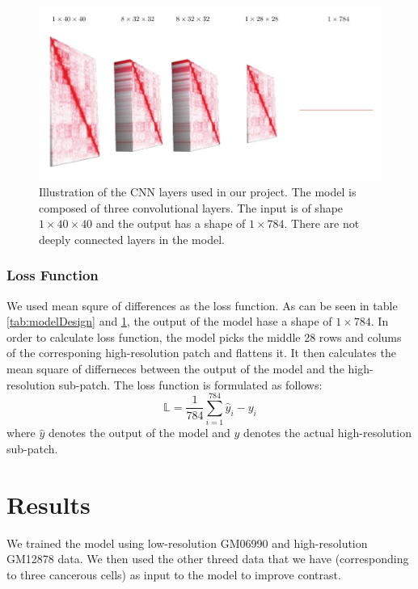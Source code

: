 \documentclass{article}
\begin{document}
\begin{figure}[H]
    \centering
    \includegraphics[width=\textwidth]{model.jpg}
    \caption{Illustration of the CNN layers used in
    our project. The model is composed of three
    convolutional layers. The input is of shape
    $1\times40\times40$ and the output has a
    shape of $1\times784$. There are not deeply
    connected layers in the model.}
    \label{fig:modelDesign}
\end{figure}
\subsubsection{Loss Function}
We used mean squre of
differences as the loss function. As can be
seen in table \ref{tab:modelDesign} and 
\ref{fig:modelDesign}, the output of
the model hase a shape of $1 \times 784$.
In order to calculate loss function,
the model picks the middle 28 rows and colums of the
corresponing high-resolution patch and flattens
it. It then calculates the mean square of differneces
between the output of the model and the high-resolution
sub-patch. The loss function is formulated as follows:
\begin{equation}
    \mathbb{L} = 
    \frac{1}{784}\sum_{i=1}^{784}{\hat{y}_i - y_i}
\end{equation}
where $\hat{y}$ denotes the output of the model and
$y$ denotes the actual high-resolution sub-patch.
\section{Results}
We trained the model using low-resolution 
 GM06990 and high-resolution
 GM12878 data. We then used the other threed
 data that we have (corresponding to three
 cancerous cells) as input to the model to 
 improve contrast.
\end{document}
